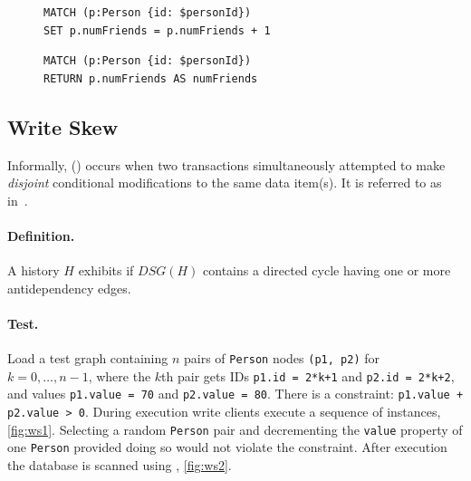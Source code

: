\begin{figure}[htb]
\centering
\begin{minipage}{0.41\linewidth}
\begin{lstlisting}[language=cypher,label=fig:lu1,caption=\tx{Lost Update $T_\mathrm{W}$}.]
MATCH (p:Person {id: $personId})
SET p.numFriends = p.numFriends + 1
\end{lstlisting}
\end{minipage}
\quad
\begin{minipage}{0.52\linewidth}
\begin{lstlisting}[language=cypher,label=fig:lu2,caption=\tx{Lost Update $T_\mathrm{R}$}.]
MATCH (p:Person {id: $personId})
RETURN p.numFriends AS numFriends
\end{lstlisting}
\end{minipage}
\end{figure}

\subsection{Write Skew}
\label{sec:write-skew}

Informally,  () occurs when two transactions simultaneously attempted to make \emph{disjoint} conditional modifications to the same data item(s).
It is referred to as  in~\cite{adya1999weak,DBLP:journals/tods/FeketeLOOS05}.

\paragraph{Definition.}
A history $H$ exhibits  if $\textit{DSG}(H)$ contains a directed cycle having one or more antidependency edges.

\paragraph{Test.}
Load a test graph containing $n$ pairs of \texttt{Person} nodes \texttt{(p1, p2)} for $k = 0, \ldots, n-1$, where the $k$th pair gets IDs \texttt{p1.id = 2*k+1} and \texttt{p2.id = 2*k+2}, and values \texttt{p1.value = 70} and \texttt{p2.value = 80}.
There is a constraint: \texttt{p1.value + p2.value > 0}.
During execution write clients execute a sequence of  instances, \autoref{fig:ws1}.
Selecting a random \texttt{Person} pair and decrementing the \texttt{value} property of one \texttt{Person} provided doing so would not violate the constraint.
After execution the database is scanned using , \autoref{fig:ws2}.

